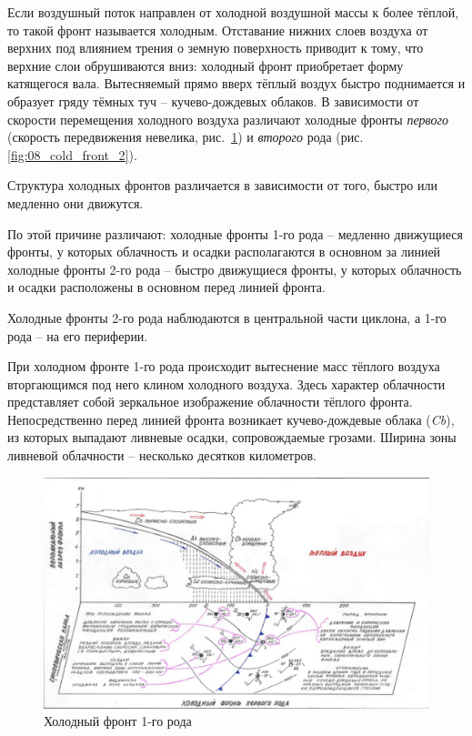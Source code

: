 \documentclass[a4paper, 12pt, twoside, final, book, russian, fittopage, cyremdash, openright]{ncc}
\begin{document}
Если воздушный поток направлен от холодной воздушной массы к более
тёплой, то такой фронт называется холодным. Отставание нижних слоев
воздуха от верхних под влиянием трения о земную поверхность приводит к
тому, что верхние слои обрушиваются вниз: холодный фронт приобретает
форму катящегося вала. Вытесняемый прямо вверх тёплый воздух быстро
поднимается и образует гряду тёмных туч \--- кучево-дождевых
облаков. В зависимости от скорости перемещения холодного воздуха
различают холодные фронты \textit{первого} (скорость передвижения
невелика, рис.~\ref{fig:07_cold_front_1}) и \textit{второго} рода
(рис.\ref{fig:08_cold_front_2}).

Структура холодных фронтов различается в зависимости от того, быстро
или медленно они движутся.

По этой причине различают: холодные фронты 1-го
рода \--- медленно движущиеся фронты,
у которых облачность и осадки располагаются в основном за линией
холодные фронты 2-го рода \--- быстро
движущиеся фронты, у которых облачность и осадки расположены в
основном перед линией фронта.

Холодные фронты 2-го рода наблюдаются в центральной части
циклона, а 1-го рода \--- на его периферии.

При холодном фронте 1-го рода происходит вытеснение масс тёплого
воздуха вторгающимся под него клином холодного воздуха. Здесь характер
облачности представляет собой зеркальное изображение облачности
тёплого фронта. Непосредственно перед линией фронта возникает
кучево-дождевые облака (\textit{Cb}), из которых выпадают ливневые осадки,
сопровождаемые грозами. Ширина зоны ливневой облачности \--- несколько
десятков километров.

\begin{figure}[htb]
   \centering
   \includegraphics[scale=0.7]{07_cold_front_1.pdf}
   \caption{Холодный фронт 1-го рода}
   \label{fig:07_cold_front_1}
\end{figure}
\end{document}
